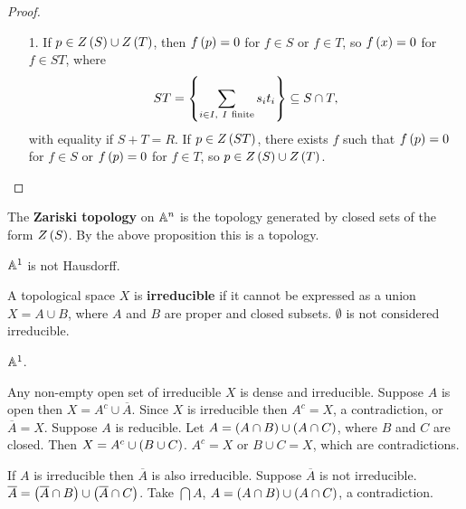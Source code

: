 \begin{proof}
\hfill
\begin{itemize}
\item[1.] If $ p \in Z\left( S \right) \cup Z\left( T \right) $, then $ f\left( p \right) = 0 $ for $ f \in S $ or $ f \in T $, so $ f\left( x \right) = 0 $ for $ f \in ST $, where
$$ ST = \cb{\sum_{i \in I, \ I \ \text{finite}} s_it_i} \subseteq S \cap T, $$
with equality if $ S + T = R $. If $ p \in Z\left( ST \right) $, there exists $ f $ such that $ f\left( p \right) = 0 $ for $ f \in S $ or $ f\left( p \right) = 0 $ for $ f \in T $, so $ p \in Z\left( S \right) \cup Z\left( T \right) $.
\end{itemize}
\end{proof}

\begin{definition}
The \textbf{Zariski topology} on $ \mathbb{A}^n $ is the topology generated by closed sets of the form $ Z\left( S \right) $. By the above proposition this is a topology.
\end{definition}

\begin{example1}
$ \mathbb{A}^1 $ is not Hausdorff.
\end{example1}

\begin{definition}
A topological space $ X $ is \textbf{irreducible} if it cannot be expressed as a union $ X = A \cup B $, where $ A $ and $ B $ are proper and closed subsets. $ \emptyset $ is not considered irreducible.
\end{definition}

\begin{example1}
$ \mathbb{A}^1 $.
\end{example1}

\begin{example1}
Any non-empty open set of irreducible $ X $ is dense and irreducible. Suppose $ A $ is open then $ X = A^c \cup \overline{A} $. Since $ X $ is irreducible then $ A^c = X $, a contradiction, or $ \overline{A} = X $. Suppose $ A $ is reducible. Let $ A = \left( A \cap B \right) \cup \left( A \cap C \right) $, where $ B $ and $ C $ are closed. Then $ X = A^c \cup \left( B \cup C \right) $. $ A^c = X $ or $ B \cup C = X $, which are contradictions.
\end{example1}

\begin{example1}
If $ A $ is irreducible then $ \overline{A} $ is also irreducible. Suppose $ \overline{A} $ is not irreducible. $ \overline{A} = \left( \overline{A} \cap B \right) \cup \left( \overline{A} \cap C \right) $. Take $ \bigcap A $, $ A = \left( A \cap B \right) \cup \left( A \cap C \right) $, a contradiction.
\end{example1}

